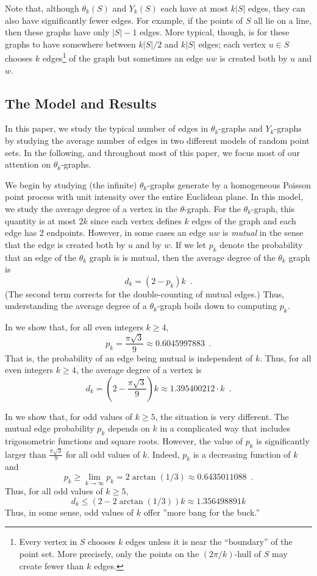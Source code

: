\documentclass{patmorin}
\begin{document}
Note that, although $\theta_k(S)$ and $Y_k(S)$ each have at most $k|S|$
edges, they can also have significantly fewer edges.  For example, if
the points of $S$ all lie on a line, then these graphs have only $|S|-1$
edges.  More typical, though, is for these graphs to have somewhere
between $k|S|/2$ and $k|S|$ edges;  each vertex $u\in S$ chooses $k$
edges\footnote{Every vertex in $S$ chooses $k$ edges unless it is near the
``boundary'' of the point set.  More precisely, only the points on the
$(2\pi/k)$-hull \cite{alpha-hull} of $S$ may create fewer than $k$ edges.}
of the graph but sometimes an edge $uw$ is created both by $u$ and $w$.

\subsection{The Model and Results}

In this paper, we study the typical number of edges in $\theta_k$-graphs
and $Y_k$-graphs by studying the average number of edges in two different
models of random point sets.  In the following, and throughout most of
this paper, we focus most of our attention on $\theta_k$-graphs.

We begin by studying (the infinite) $\theta_k$-graphs generate by a
homogeneous Poisson point process with unit intensity over the entire
Euclidean plane.  In this model, we study the average degree of a vertex
in the $\theta$-graph.  For the $\theta_k$-graph, this quantity is at
most $2k$ since each vertex defines $k$ edges of the graph and each edge
has 2 endpoints.  However, in some cases an edge $uw$ is \emph{mutual}
in the sense that the edge is created both by $u$ and by $w$.  If we
let $p_k$ denote the probability that an edge of the $\theta_k$ graph
is is mutual, then the average degree of the $\theta_k$ graph is
\[
    d_k = (2-p_k)k \enspace .
\]
(The second term corrects for the double-counting of mutual edges.)  Thus,
understanding the average degree of a $\theta_k$-graph boils down to
computing $p_k$.

In  we show that, for all even integers $k\ge 4$,
\[
    p_k=\frac{\pi\sqrt{3}}{9}\approx 0.6045997883 \enspace .
\]
That is, the probability of an edge being mutual is independent of
$k$. Thus, for all even integers $k\ge 4$, the average degree of a
vertex is
\[
  d_k = \left(2-\frac{\pi\sqrt{3}}{9}\right)k \approx 1.395400212\cdot k \enspace .
\]

In  we show that, for odd values of $k\ge 5$, the situation
is very different.  The mutual edge probability $p_k$ depends on
$k$ in a complicated way that includes trigonometric functions and
square roots.  However, the value of $p_k$ is significantly larger than
$\frac{\pi\sqrt{3}}{9}$ for all odd values of $k$.  Indeed, $p_k$ is a
decreasing function of $k$ and
\[
  p_k\ge \lim_{k\to\infty} p_k = 2\arctan(1/3)\approx 0.6435011088 \enspace .
\]
Thus, for all odd values of $k\ge 5$,
\[
   d_k \le (2-2\arctan(1/3))k \approx 1.356498891 k
\]
Thus, in some sense, odd values of $k$ offer ''more bang for the buck.''
\end{document}

